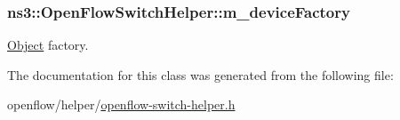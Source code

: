 \subsubsection[{\texorpdfstring{m\+\_\+device\+Factory}{m_deviceFactory}}]{ ns3\+::\+Open\+Flow\+Switch\+Helper\+::m\+\_\+device\+Factory\hspace{0.3cm}{\ttfamily [private]}}\hypertarget{classns3_1_1OpenFlowSwitchHelper_a912ed5b5569dd169bf39e8a910cdb73e}{}\label{classns3_1_1OpenFlowSwitchHelper_a912ed5b5569dd169bf39e8a910cdb73e}


\hyperlink{classns3_1_1Object}{Object} factory. 



The documentation for this class was generated from the following file\+:\begin{DoxyCompactItemize}
\item 
openflow/helper/\hyperlink{openflow-switch-helper_8h}{openflow-\/switch-\/helper.\+h}\end{DoxyCompactItemize}
